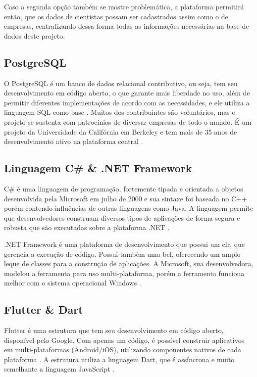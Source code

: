Caso a segunda opção também se mostre problemática, a plataforma permitirá então, que os dados de cientistas possam ser cadastrados assim como o de empresas, centralizando dessa forma todas as informações necessárias na base de dados deste projeto.

\subsection{PostgreSQL}\label{subsec:postgresql}

O PostgreSQL é um banco de dados relacional contributivo, ou seja, tem seu desenvolvimento em código aberto, o que garante mais liberdade no uso, além de permitir diferentes implementações de acordo com as necessidades, e ele utiliza a linguagem SQL como base \cite{Amazon}. Muitos dos contribuintes são voluntários, mas o projeto se sustenta com patrocínios de diversar empresas de todo o mundo. É um projeto da Universidade da Califórnia em Berkeley e tem mais de 35 anos de desenvolvimento ativo na plataforma central \cite{PostgreSQL}.

\subsection{Linguagem C{\#} {\&} .NET Framework}\label{subsec:csharp}

C{\#} é uma linguagem de programação, fortemente tipada e orientada a objetos desenvolvida pela Microsoft em julho de 2000 e sua sintaxe foi baseada no C++ porém contendo influências de outras linguagens como Java. A linguagem permite que desenvolvedores construam diversos tipos de aplicações de forma segura e robusta que são executadas sobre a plataforma .NET \cite{CSharp}.

.NET Framework é uma plataforma de desenvolvimento que possui um \gls{clr}, que gerencia a execução de código. Possui também uma \gls{bcl}, oferecendo um amplo leque de classes para a construção de aplicações. A Microsoft, sua desenvolvedora, modelou a ferramenta para uso multi-plataforma, porém a ferramenta funciona melhor com o sistema operacional Windows \cite{CSharpDevelopment}.

\subsection{Flutter {\&} Dart}\label{subsec:flutterdart}

Flutter é uma estrutura que tem seu desenvolvimento em código aberto, disponível pelo Google. Com apenas um código, é possível construir aplicativos em multi-plataformas (Android/iOS), utilizando componentes nativos de cada plataforma \cite{Flutter}. A estrutura utiliza a linguagem Dart, que é assíncrona e muito semelhante a linguagem JavaScript \cite{Dart}.

